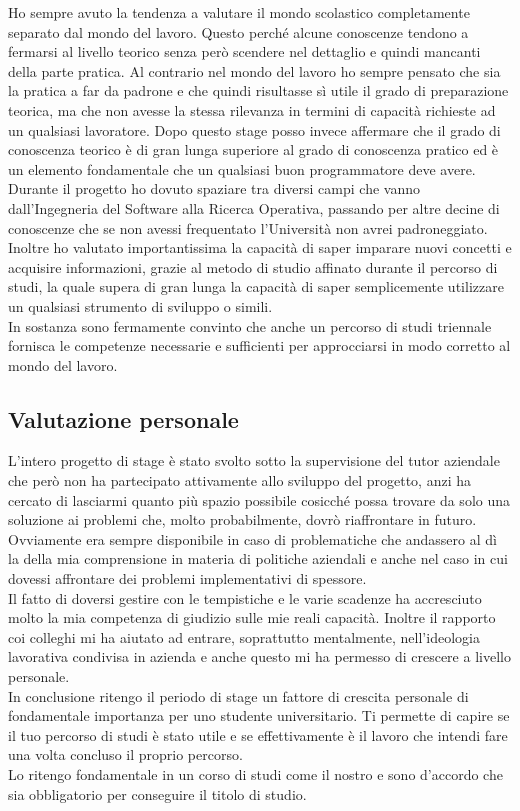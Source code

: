 Ho sempre avuto la tendenza a valutare il mondo scolastico completamente separato dal mondo del lavoro. Questo perché alcune conoscenze tendono a fermarsi al livello teorico
senza però scendere nel dettaglio e quindi mancanti della parte pratica. Al contrario nel mondo del lavoro ho sempre pensato che sia la pratica a far da padrone e che quindi
risultasse sì utile il grado di preparazione teorica, ma che non avesse la stessa rilevanza in termini di capacità richieste ad un qualsiasi lavoratore. Dopo questo stage posso
invece affermare che il grado di conoscenza teorico è di gran lunga superiore al grado di conoscenza pratico ed è un elemento fondamentale che un qualsiasi buon programmatore 
deve avere.\\ Durante il progetto ho dovuto spaziare tra diversi campi che vanno dall'Ingegneria del Software alla Ricerca Operativa, passando per altre decine di conoscenze
che se non avessi frequentato l'Università non avrei padroneggiato. Inoltre ho valutato importantissima la capacità di saper imparare nuovi concetti e acquisire informazioni,
grazie al metodo di studio affinato durante il percorso di studi, la quale supera di gran lunga la capacità di saper semplicemente utilizzare un qualsiasi strumento
di sviluppo o simili.\\ In sostanza sono fermamente convinto che anche un percorso di studi triennale fornisca le competenze necessarie e sufficienti per approcciarsi in modo
corretto al mondo del lavoro.

\subsection{Valutazione personale}

L'intero progetto di stage è stato svolto sotto la supervisione del tutor aziendale che però non ha partecipato attivamente allo sviluppo del progetto, anzi ha cercato di 
lasciarmi quanto più spazio possibile cosicché possa trovare da solo una soluzione ai problemi che, molto probabilmente, dovrò riaffrontare in futuro. Ovviamente era sempre
disponibile in caso di problematiche che andassero al dì la della mia comprensione in materia di politiche aziendali e anche nel caso in cui dovessi affrontare dei problemi
implementativi di spessore.\\ Il fatto di doversi gestire con le tempistiche e le varie scadenze ha accresciuto molto la mia competenza di giudizio sulle mie reali capacità.
Inoltre il rapporto coi colleghi mi ha aiutato ad entrare, soprattutto mentalmente, nell'ideologia lavorativa condivisa in azienda e anche questo mi ha permesso di crescere
a livello personale.\\ In conclusione ritengo il periodo di stage un fattore di crescita personale di fondamentale importanza per uno studente universitario. Ti permette di capire
se il tuo percorso di studi è stato utile e se effettivamente è il lavoro che intendi fare una volta concluso il proprio percorso.\\ Lo ritengo fondamentale in un corso di studi
come il nostro e sono d'accordo che sia obbligatorio per conseguire il titolo di studio.